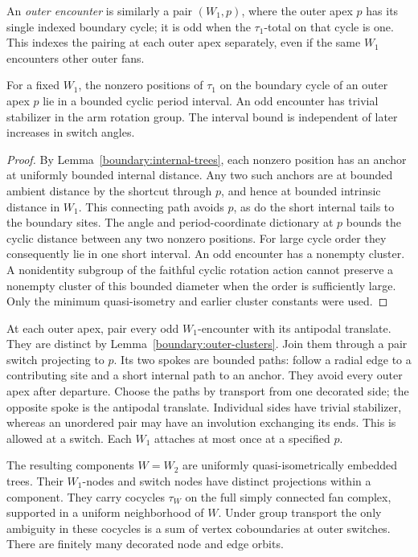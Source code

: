 An \emph{outer encounter} is similarly a pair $(W_1,p)$, where the outer
apex $p$ has its single indexed boundary cycle; it is odd when the
$\tau_1$-total on that cycle is one. This indexes the pairing at each
outer apex separately, even if the same $W_1$ encounters other outer fans.

\begin{lemma}\label{boundary:outer-clusters}
For a fixed $W_1$, the nonzero positions of $\tau_1$ on the boundary cycle
of an outer apex $p$ lie in a bounded cyclic period interval. An odd
encounter has trivial stabilizer in the arm rotation group. The interval
bound is independent of later increases in switch angles.
\end{lemma}

\begin{proof}
By Lemma~\ref{boundary:internal-trees}, each nonzero position has an anchor
at uniformly bounded internal distance. Any two such anchors are at
bounded ambient distance by the shortcut through $p$, and hence at bounded
intrinsic distance in $W_1$. This connecting path avoids $p$, as do the short
internal tails to the boundary sites. The angle and period-coordinate
dictionary at $p$ bounds the cyclic distance between any two nonzero
positions. For large cycle order they consequently lie in one short
interval. An odd encounter has a nonempty cluster. A nonidentity subgroup
of the faithful cyclic rotation action cannot preserve a nonempty cluster
of this bounded diameter when the order is sufficiently large. Only the
minimum quasi-isometry and earlier cluster constants were used.
\end{proof}

At each outer apex, pair every odd $W_1$-encounter with its antipodal
translate. They are distinct by Lemma~\ref{boundary:outer-clusters}. Join
them through a pair switch projecting to $p$. Its two spokes are bounded
paths: follow a radial edge to a contributing site and a short internal
path to an anchor. They avoid every outer apex after departure. Choose the
paths by transport from one decorated side; the opposite spoke is the
antipodal translate. Individual sides have trivial stabilizer, whereas an
unordered pair may have an involution exchanging its ends. This is allowed
at a switch. Each $W_1$ attaches at most once at a specified $p$.

\begin{proposition}\label{boundary:completed-trees}
The resulting components $W=W_2$ are uniformly quasi-isometrically embedded
trees. Their $W_1$-nodes and switch nodes have distinct projections within a
component. They carry cocycles $\tau_W$ on the full simply connected fan
complex, supported in a uniform neighborhood of $W$. Under group transport
the only ambiguity in these cocycles is a sum of vertex coboundaries at
outer switches. There are finitely many decorated node and edge orbits.
\end{proposition}

